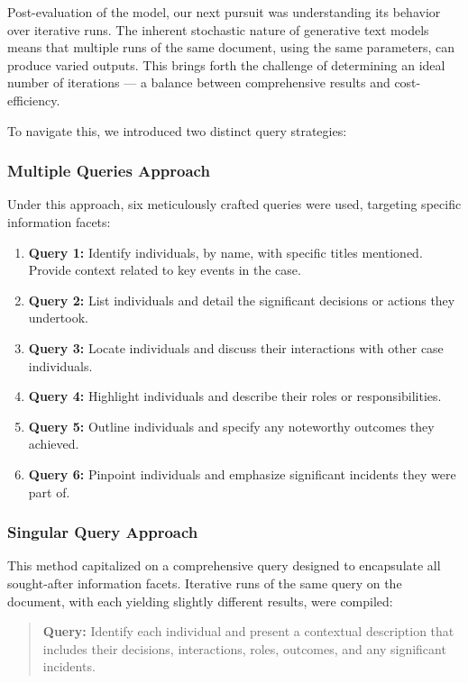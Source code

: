 \documentclass{article}
\begin{document}
Post-evaluation of the model, our next pursuit was understanding its behavior over iterative runs. The inherent stochastic nature of generative text models means that multiple runs of the same document, using the same parameters, can produce varied outputs. This brings forth the challenge of determining an ideal number of iterations — a balance between comprehensive results and cost-efficiency.

To navigate this, we introduced two distinct query strategies:

\subsubsection{Multiple Queries Approach}

Under this approach, six meticulously crafted queries were used, targeting specific information facets:

\begin{enumerate}
    \item \textbf{Query 1:} Identify individuals, by name, with specific titles mentioned. Provide context related to key events in the case.
    \item \textbf{Query 2:} List individuals and detail the significant decisions or actions they undertook.
    \item \textbf{Query 3:} Locate individuals and discuss their interactions with other case individuals.
    \item \textbf{Query 4:} Highlight individuals and describe their roles or responsibilities.
    \item \textbf{Query 5:} Outline individuals and specify any noteworthy outcomes they achieved.
    \item \textbf{Query 6:} Pinpoint individuals and emphasize significant incidents they were part of.
\end{enumerate}

\subsubsection{Singular Query Approach}

This method capitalized on a comprehensive query designed to encapsulate all sought-after information facets. Iterative runs of the same query on the document, with each yielding slightly different results, were compiled:

\begin{quote}
\textbf{Query:} Identify each individual and present a contextual description that includes their decisions, interactions, roles, outcomes, and any significant incidents.
\end{quote}
\end{document}
